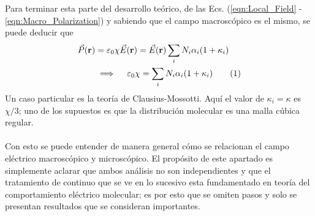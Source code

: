 \documentclass[12pt, oneside, numbers, spanish]{ezthesis}
\newcommand\numberthis{\addtocounter{equation}{1}\tag{\theequation}}
\numberwithin{equation}{section}
\begin{document}
Para terminar esta parte del desarrollo teórico, de las Ecs. (\ref{eqn:Local_Field} - \ref{eqn:Macro_Polarization}) y sabiendo que el campo macroscópico es el mismo, se puede deducir que
\begin{align*}
\vec{P}(\mathbf{r}) &= \varepsilon_0\chi\vec{E}(\mathbf{r}) = \vec{E}(\mathbf{r})\sum_iN_i\alpha_i(1+\kappa_i)\\
&\implies\quad \varepsilon_0\chi = \sum_iN_i\alpha_i(1+\kappa_i) \numberthis
\end{align*}
Un caso particular es la teoría de Clausius-Mossotti. Aquí el valor de $\kappa_i = \kappa$ es $\chi/3$; uno de los supuestos es que la distribución molecular es una malla cúbica regular.\\\\
Con esto se puede entender de manera general cómo se relacionan el campo eléctrico macroscópico y microscópico. El propósito de este apartado es simplemente aclarar que ambos análisis no son independientes y que el tratamiento de continuo que se ve en lo sucesivo esta fundamentado en teoría del comportamiento eléctrico molecular; es por esto que se omiten pasos y solo se presentan resultados que se consideran importantes.
\end{document}
